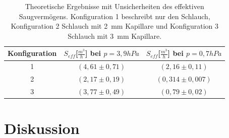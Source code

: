 \documentclass[a4paper,usenatbib]{aspdoc}
\begin{document}
            \begin{table}
                \centering
                \begin{tabular}{c|c|c}
                    \multicolumn{1}{c}{Konfiguration} & \multicolumn{1}{c}{$S_{eff}$[$\frac{m^3}{h}$] bei $p = 3,9 hPa$} & \multicolumn{1}{c}{$S_{eff}$[$\frac{m^3}{h}$] bei $p = 0,7 hPa$} \\
                    \cmidrule(lr){1-1}\cmidrule(lr){2-2}\cmidrule(lr){3-3}\cmidrule(lr){4-4}
                    \toprule
                     1  & $(4,61 \pm 0,71)$    & $(2,16 \pm 0,11)$   \\
                     2           & $(2,17 \pm 0,19)$     & $(0,314 \pm 0,007)$     \\
                     3          & $(3,77 \pm 0,49)$     & $(0,79 \pm 0,02)$     \\
                    \bottomrule
                \end{tabular}
                \caption{Theoretische Ergebnisse mit Unsicherheiten des effektiven Saugvermögens. Konfiguration 1 beschreibt nur den Schlauch, Konfiguration 2 Schlauch mit \SI{2}{\milli\metre} Kapillare und Konfiguration 3 Schlauch mit \SI{3}{\milli\metre} Kapillare.}
                \label{tab:theoseff}
            \end{table}
        
        
    \section{Diskussion}\label{sec:discussion}
\end{document}

